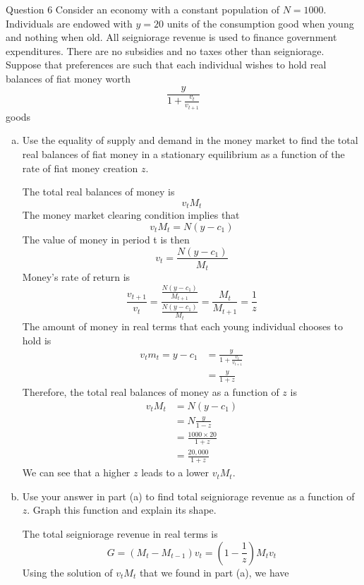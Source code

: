 \documentclass[a4paper]{article}
\newif\IfInSansMode
\numberwithin{equation}{section}
\numberwithin{figure}{section}
\begin{document}
	\begin{questionbox}{Question 6}
		Consider an economy with a constant population of \( N = 1000 \). Individuals are endowed with \( y = 20 \) units of the consumption good when young and nothing when old. All seigniorage revenue is used to finance government expenditures. There are no subsidies and no taxes other than seigniorage. Suppose that preferences are such that each individual wishes to hold real balances of fiat money worth
		\[
			\frac{y}{1 + \frac{v_t}{v_{t+1}}}
		\]
		goods
		\begin{enumerate}[(a)]
			\item Use the equality of supply and demand in the money market to find the total real balances of fiat money in a stationary equilibrium as a function of the rate of fiat money creation \( z \).
			\begin{explanationbox}
				The total real balances of money is
				\[
					v_tM_t
				\]
				The money market clearing condition implies that
				\[
					v_tM_t = N(y-c_1)
				\]
				The value of money in period t is then
				\[
					v_t = \frac{N(y-c_1)}{M_t}
				\]
				Money's rate of return is
				\[
					\frac{v_{t+1}}{v_t} = \frac{\frac{N(y-c_1)}{M_{t+1}}}{\frac{N(y-c_1)}{M_t}} = \frac{M_t}{M_{t+1}} = \frac{1}{z}
				\]
				The amount of money in real terms that each young individual chooses to hold is
				\begin{align*}
					v_tm_t = y - c_1 &= \frac{y}{1 + \frac{v_t}{v_{t+1}}}\\
					&= \frac{y}{1 + z}
				\end{align*}
				Therefore, the total real balances of money as a function of \( z \) is
				\begin{align*}
					v_tM_t &= N(y-c_1)\\
					&= N\frac{y}{1 - z}\\
					&= \frac{1000 \times 20}{1 + z}\\
					&= \frac{20,000}{1 + z}
				\end{align*}
				We can see that a higher \( z \) leads to a lower \( v_tM_t \).
			\end{explanationbox}\pagebreak
			\item Use your answer in part (a) to find total seigniorage revenue as a function of \( z \). Graph this function and explain its shape.
			\begin{explanationbox}
				The total seigniorage revenue in real terms is
				\[
					G = (M_t - M_{t-1})v_t = \left( 1 - \frac{1}{z} \right) M_tv_t
				\]
				Using the solution of \( v_tM_t \) that we found in part (a), we have

\end{explanationbox}
\end{enumerate}
\end{questionbox}
\end{document}
